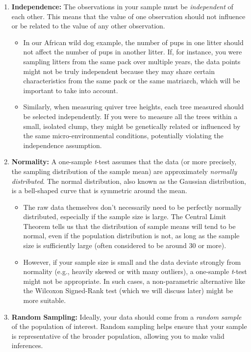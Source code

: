 \documentclass[
  letterpaper,
]{book}
\providecommand{\tightlist}{%
  \setlength{\itemsep}{0pt}\setlength{\parskip}{0pt}}\usepackage{longtable,booktabs,array}
\begin{document}
\begin{enumerate}
\def\labelenumi{\arabic{enumi}.}
\setcounter{enumi}{1}
\item
  \textbf{Independence:} The observations in your sample must be
  \emph{independent} of each other. This means that the value of one
  observation should not influence or be related to the value of any
  other observation.

  \begin{itemize}
  \tightlist
  \item
    In our African wild dog example, the number of pups in one litter
    should not affect the number of pups in another litter. If, for
    instance, you were sampling litters from the same pack over multiple
    years, the data points might not be truly independent because they
    may share certain characteristics from the same pack or the same
    matriarch, which will be important to take into account.
  \item
    Similarly, when measuring quiver tree heights, each tree measured
    should be selected independently. If you were to measure all the
    trees within a small, isolated clump, they might be genetically
    related or influenced by the same micro-environmental conditions,
    potentially violating the independence assumption.
  \end{itemize}
\item
  \textbf{Normality:} A one-sample \emph{t}-test assumes that the data
  (or more precisely, the sampling distribution of the sample mean) are
  approximately \emph{normally distributed}. The normal distribution,
  also known as the Gaussian distribution, is a bell-shaped curve that
  is symmetric around the mean.

  \begin{itemize}
  \tightlist
  \item
    The raw data themselves don't necessarily need to be perfectly
    normally distributed, especially if the sample size is large. The
    Central Limit Theorem tells us that the distribution of sample means
    will tend to be normal, even if the population distribution is not,
    as long as the sample size is sufficiently large (often considered
    to be around 30 or more).
  \item
    However, if your sample size is small and the data deviate strongly
    from normality (e.g., heavily skewed or with many outliers), a
    one-sample \emph{t}-test might not be appropriate. In such cases, a
    non-parametric alternative like the Wilcoxon Signed-Rank test (which
    we will discuss later) might be more suitable.
  \end{itemize}
\item
  \textbf{Random Sampling:} Ideally, your data should come from a
  \emph{random sample} of the population of interest. Random sampling
  helps ensure that your sample is representative of the broader
  population, allowing you to make valid inferences.


\end{enumerate}
\end{document}
